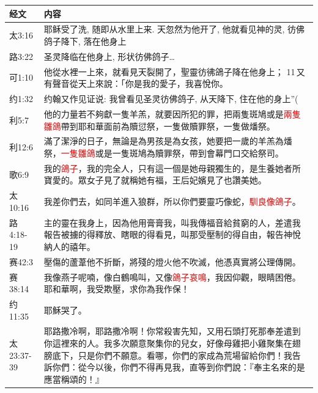\begin{table}[H]
\centering
\begin{tabular}{p{4em}|p{44em}}  \toprule
经文&内容\\  \midrule
太3:16&耶稣受了洗, 随即从水里上来. 天忽然为他开了, 他就看见神的灵, 彷佛鸽子降下, 落在他身上\\  \midrule
路3:22&圣灵降临在他身上, 形状彷佛鸽子…\\  \midrule
可1:10&他從水裡一上來，就看見天裂開了，聖靈彷彿鴿子降在他身上； 11 又有聲音從天上來說：「你是我的愛子，我喜悅你。\\  \midrule
约1:32&约翰又作见证说: 我曾看见圣灵彷佛鸽子, 从天降下, 住在他的身上”(\\  \midrule
利5:7&他的力量若不夠獻一隻羊羔，就要因所犯的罪，把兩隻斑鳩或是\textcolor{red}{兩隻雛鴿}帶到耶和華面前為贖愆祭，一隻做贖罪祭，一隻做燔祭。\\  \midrule
利12:6&滿了潔淨的日子，無論是為男孩是為女孩，她要把一歲的羊羔為燔祭，\textcolor{red}{一隻雛鴿}或是一隻斑鳩為贖罪祭，帶到會幕門口交給祭司。\\  \midrule
歌6:9&我的\textcolor{red}{鴿子}，我的完全人，只有這一個是她母親獨生的，是生養她者所寶愛的。眾女子見了就稱她有福，王后妃嬪見了也讚美她。\\  \midrule
太10:16&我差你們去，如同羊進入狼群，所以你們要靈巧像蛇，\textcolor{red}{馴良像鴿子}。\\  \midrule
路4:18-19&主的靈在我身上，因為他用膏膏我，叫我傳福音給貧窮的人，差遣我報告被擄的得釋放、瞎眼的得看見，叫那受壓制的得自由，報告神悅納人的禧年。\\  \midrule
赛42:3&壓傷的蘆葦他不折斷，將殘的燈火他不吹滅，他憑真實將公理傳開。\\  \midrule
赛38:14&我像燕子呢喃，像白鶴鳴叫，又像\textcolor{red}{鴿子哀鳴}，我因仰觀，眼睛困倦。耶和華啊，我受欺壓，求你為我作保！\\  \midrule
约11:35&耶穌哭了。\\  \midrule
太23:37-39&耶路撒冷啊，耶路撒冷啊！你常殺害先知，又用石頭打死那奉差遣到你這裡來的人。我多次願意聚集你的兒女，好像母雞把小雞聚集在翅膀底下，只是你們不願意。看哪，你們的家成為荒場留給你們！我告訴你們：從今以後，你們不得再見我，直等到你們說：『奉主名來的是應當稱頌的！』\\  \midrule
\end{tabular}
\end{table}

